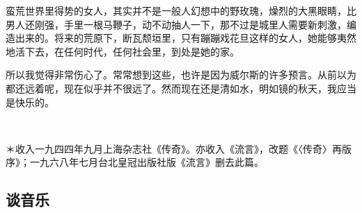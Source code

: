 \par 蛮荒世界里得势的女人，其实并不是一般人幻想中的野玫瑰，燥烈的大黑眼睛，比男人还刚强，手里一根马鞭子，动不动抽人一下，那不过是城里人需要新刺激，编造出来的。将来的荒原下，断瓦颓垣里，只有蹦蹦戏花旦这样的女人，她能够夷然地活下去，在任何时代，任何社会里，到处是她的家。
\par 所以我觉得非常伤心了。常常想到这些，也许是因为威尔斯的许多预言。从前以为都还远着呢，现在似乎并不很远了。然而现在还是清如水，明如镜的秋天，我应当是快乐的。
\par  
\par ＊收入一九四四年九月上海杂志社《传奇》。亦收入《流言》，改题《〈传奇〉再版序》；一九六八年七月台北皇冠出版社版《流言》删去此篇。


\subsection{谈音乐}

